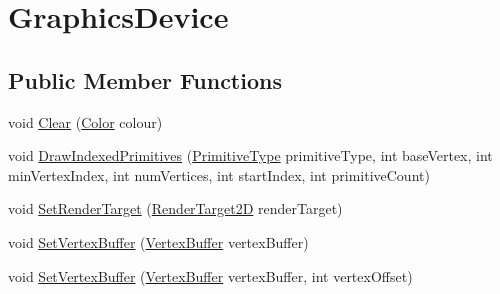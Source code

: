 \hypertarget{classMicrosoft_1_1Xna_1_1Framework_1_1Graphics_1_1GraphicsDevice}{}\section{Graphics\+Device}
\label{classMicrosoft_1_1Xna_1_1Framework_1_1Graphics_1_1GraphicsDevice}
\subsection*{Public Member Functions}
\begin{DoxyCompactItemize}
\item 
void \hyperlink{classMicrosoft_1_1Xna_1_1Framework_1_1Graphics_1_1GraphicsDevice_a612fc3db4b8c78bc3267d8e5b2c5aa2c}{Clear} (\hyperlink{structMicrosoft_1_1Xna_1_1Framework_1_1Color}{Color} colour)
\item 
void \hyperlink{classMicrosoft_1_1Xna_1_1Framework_1_1Graphics_1_1GraphicsDevice_a0faf874febc011e5fb516a196c2d476d}{Draw\+Indexed\+Primitives} (\hyperlink{namespaceMicrosoft_1_1Xna_1_1Framework_1_1Graphics_a240c1924416689e5700ff0d9f30539d9}{Primitive\+Type} primitive\+Type, int base\+Vertex, int min\+Vertex\+Index, int num\+Vertices, int start\+Index, int primitive\+Count)
\item 
void \hyperlink{classMicrosoft_1_1Xna_1_1Framework_1_1Graphics_1_1GraphicsDevice_af074653b40c063901ba3057968478cb9}{Set\+Render\+Target} (\hyperlink{classMicrosoft_1_1Xna_1_1Framework_1_1Graphics_1_1RenderTarget2D}{Render\+Target2\+D} render\+Target)
\item 
void \hyperlink{classMicrosoft_1_1Xna_1_1Framework_1_1Graphics_1_1GraphicsDevice_aaf9117876e9bd01f40dbc8a619d90248}{Set\+Vertex\+Buffer} (\hyperlink{classMicrosoft_1_1Xna_1_1Framework_1_1Graphics_1_1VertexBuffer}{Vertex\+Buffer} vertex\+Buffer)
\item 
void \hyperlink{classMicrosoft_1_1Xna_1_1Framework_1_1Graphics_1_1GraphicsDevice_ac71e66db181f73dd26e3c45558e32ef4}{Set\+Vertex\+Buffer} (\hyperlink{classMicrosoft_1_1Xna_1_1Framework_1_1Graphics_1_1VertexBuffer}{Vertex\+Buffer} vertex\+Buffer, int vertex\+Offset)
\end{DoxyCompactItemize}
